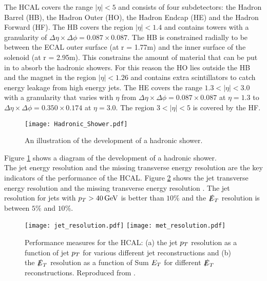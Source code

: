 The HCAL covers the range $|\eta| < 5$ and consists of four subdetectors: the
Hadron Barrel (HB), the Hadron Outer (HO), the Hadron Endcap (HE) and the Hadron
Forward (HF). The HB covers the region $|\eta| < 1.4$ and contains towers with a 
granularity of $\Delta\eta\times\Delta\phi = 0.087\times0.087$. The HB is 
constrained radially to be between the ECAL outer surface (at r = 1.77m) and the
inner surface of the solenoid (at r = 2.95m). This constrains the amount of 
material that can be put in to absorb the hadronic showers. For this reason the 
HO lies outside the HB and the magnet in the region $|\eta| < 1.26$ and contains
extra scintillators to catch energy leakage from high energy jets. The HE covers
the range $1.3 < |\eta| < 3.0$ with a granularity that varies with $\eta$ from 
$\Delta\eta\times\Delta\phi = 0.087\times0.087$ at $\eta = 1.3$ to 
$\Delta\eta\times\Delta\phi = 0.350\times0.174$ at $\eta = 3.0$. The region $3 <
 |\eta| < 5$ is covered by the HF. \\

\begin{figure}
\begin{center}
\texttt{[image: Hadronic\_Shower.pdf]}
\end{center}
\caption{An illustration of the development of a hadronic shower.}
\label{fig:hadronic_shower}
\end{figure}

Figure \ref{fig:hadronic_shower} shows a diagram of the development of a
hadronic shower. \\

The jet energy resolution and the missing transverse energy resolution are the 
key indicators of the performance of the HCAL. Figure \ref{fig:jetmet} shows the
jet transverse energy resolution and the missing transverse energy resolution
\cite{jet_resolution, met_resolution}. The jet resolution for jets with $p_{T} >
40\, \mathrm{GeV}$ is better than $10\unit{\%}$ and the $\slashed{E}_{T}$ resolution is between
$5\unit{\%}$ and $10\unit{\%}$.

\begin{figure}
\texttt{[image: jet\_resolution.pdf]}
\texttt{[image: met\_resolution.pdf]}
\caption{Performance measures for the HCAL: (a) the jet $p_{T}$ resolution as a 
function of jet $p_{T}$ for various different jet reconstructions and (b) the 
$\slashed{E}_{T}$ resolution as a function of Sum $E_{T}$ for different $\slashed{E}_{T}$
reconstructions. Reproduced from \cite{jet_resolution, met_resolution}.}
\label{fig:jetmet}
\end{figure}

